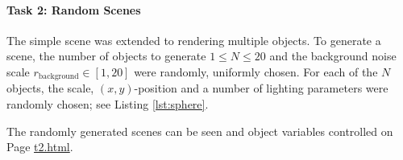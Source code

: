 \documentclass[12pt,fleqn]{article}
\begin{document}
\paragraph{Task 2: Random Scenes}
The simple scene was extended to rendering multiple objects.
To generate a scene, the number of objects to generate $1 \le N \le 20 $ and the background noise scale $r_\text{background} \in [1, 20]$ were randomly, uniformly chosen.
For each of the $N$ objects, the scale, $(x, y)$-position and a number of lighting parameters were randomly chosen; see Listing \ref{lst:sphere}.

The randomly generated scenes can be seen and object variables controlled on Page \href{https://www.student.dtu.dk/~s183911/proj/webgl-site/t2.html}{t2.html}.

\end{document}
